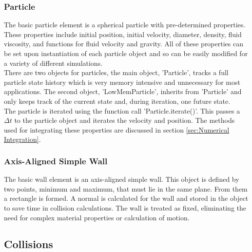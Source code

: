 \documentclass[10pt,a4paper,titlepage]{report}
\begin{document}
\subsubsection{Particle}
The basic particle element is a spherical particle with pre-determined properties. These properties include initial position, initial velocity, diameter, density, fluid viscosity, and functions for fluid velocity and gravity. All of these properties can be set upon instantiation of each particle object and so can be easily modified for a variety of different simulations.
\\There are two objects for particles, the main object, 'Particle', tracks a full particle state history which is very memory intensive and unnecessary for most applications. The second object, 'LowMemParticle', inherits from 'Particle' and only keeps track of the current state and, during iteration, one future state.
\\The particle is iterated using the function call 'Particle.iterate()'. This passes a $\Delta t$ to the particle object and iterates the velocity and position. The methods used for integrating these properties are discussed in section \ref{sec:Numerical Integration}.
\subsubsection{Axis-Aligned Simple Wall}
The basic wall element is an axis-aligned simple wall. This object is defined by two points, minimum and maximum, that must lie in the same plane. From them a rectangle is formed. A normal is calculated for the wall and stored in the object to save time in collision calculations. The wall is treated as fixed, eliminating the need for complex material properties or calculation of motion.
\subsection{Collisions}
\end{document}
